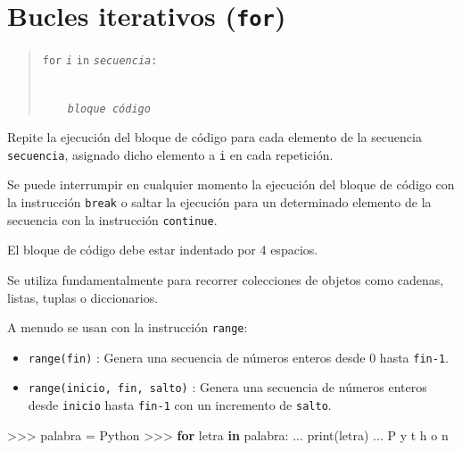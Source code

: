 \documentclass[
  spanish,
  a4paper,
]{scrreport}
\newenvironment{Shaded}{\begin{snugshade}}{\end{snugshade}}
\newcommand{\BuiltInTok}[1]{\textcolor[rgb]{0.00,0.23,0.31}{#1}}
\newcommand{\ControlFlowTok}[1]{\textcolor[rgb]{0.00,0.23,0.31}{\textbf{#1}}}
\newcommand{\KeywordTok}[1]{\textcolor[rgb]{0.00,0.23,0.31}{\textbf{#1}}}
\newcommand{\NormalTok}[1]{\textcolor[rgb]{0.00,0.23,0.31}{#1}}
\newcommand{\OperatorTok}[1]{\textcolor[rgb]{0.37,0.37,0.37}{#1}}
\newcommand{\StringTok}[1]{\textcolor[rgb]{0.13,0.47,0.30}{#1}}
\providecommand{\tightlist}{%
  \setlength{\itemsep}{0pt}\setlength{\parskip}{0pt}}
\begin{document}
\section{\texorpdfstring{Bucles iterativos
(\texttt{for})}{Bucles iterativos (for)}}\label{bucles-iterativos-for}

\begin{quote}
\texttt{for} \emph{\texttt{i}} \texttt{in}
\emph{\texttt{secuencia}}\texttt{:}\strut \\
    \emph{\texttt{bloque\ código}}
\end{quote}

Repite la ejecución del bloque de código para cada elemento de la
secuencia \texttt{secuencia}, asignado dicho elemento a \texttt{i} en
cada repetición.

Se puede interrumpir en cualquier momento la ejecución del bloque de
código con la instrucción \texttt{break} o saltar la ejecución para un
determinado elemento de la secuencia con la instrucción
\texttt{continue}.

\begin{tcolorbox}[enhanced jigsaw, arc=.35mm, bottomrule=.15mm, bottomtitle=1mm, breakable, colback=white, colbacktitle=quarto-callout-warning-color!10!white, colframe=quarto-callout-warning-color-frame, coltitle=black, left=2mm, leftrule=.75mm, opacityback=0, opacitybacktitle=0.6, rightrule=.15mm, title=\textcolor{quarto-callout-warning-color}{\faExclamationTriangle}\hspace{0.5em}{Advertencia}, titlerule=0mm, toprule=.15mm, toptitle=1mm]

El bloque de código debe estar indentado por 4 espacios.

\end{tcolorbox}

Se utiliza fundamentalmente para recorrer colecciones de objetos como
cadenas, listas, tuplas o diccionarios.

A menudo se usan con la instrucción \texttt{range}:

\begin{itemize}
\tightlist
\item
  \texttt{range(fin)} : Genera una secuencia de números enteros desde 0
  hasta \texttt{fin-1}.
\item
  \texttt{range(inicio,\ fin,\ salto)} : Genera una secuencia de números
  enteros desde \texttt{inicio} hasta \texttt{fin-1} con un incremento
  de \texttt{salto}.
\end{itemize}

\begin{Shaded}
\begin{Highlighting}[]
\OperatorTok{\textgreater{}\textgreater{}\textgreater{}}\NormalTok{ palabra }\OperatorTok{=} \StringTok{\textquotesingle{}Python\textquotesingle{}}
\OperatorTok{\textgreater{}\textgreater{}\textgreater{}} \ControlFlowTok{for}\NormalTok{ letra }\KeywordTok{in}\NormalTok{ palabra:}
\NormalTok{...     }\BuiltInTok{print}\NormalTok{(letra)}
\NormalTok{... }
\NormalTok{P}
\NormalTok{y}
\NormalTok{t}
\NormalTok{h}
\NormalTok{o}
\NormalTok{n}
\end{Highlighting}
\end{Shaded}
\end{document}
